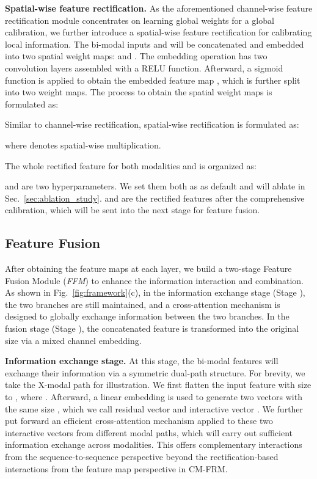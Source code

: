 \documentclass[journal]{IEEEtran}
\begin{document}
\noindent\textbf{Spatial-wise feature rectification.}
As the aforementioned channel-wise feature rectification module concentrates on learning global weights for a global calibration, we further introduce a spatial-wise feature rectification for calibrating local information.
The bi-modal inputs  and  will be concatenated and embedded into two spatial weight maps:  and .
The embedding operation has two  convolution layers assembled with a RELU function. Afterward, a sigmoid function is applied to obtain the embedded feature map , which is further split into two weight maps.
The process to obtain the spatial weight maps is formulated as:


Similar to channel-wise rectification, spatial-wise rectification is formulated as:

where  denotes spatial-wise multiplication.

The whole rectified feature for both modalities  and  is organized as:

 and  are two hyperparameters. We set them both as  as default and will ablate in Sec.~\ref{sec:ablation_study}.  and  are the rectified features after the comprehensive calibration, which will be sent into the next stage for feature fusion.

\subsection{Feature Fusion}
\label{sec:ffm}
After obtaining the feature maps at each layer, we build a two-stage Feature Fusion Module (\emph{FFM}) to enhance the information interaction and combination. As shown in Fig.~\ref{fig:framework}(c), in the information exchange stage (Stage ), the two branches are still maintained, and a cross-attention mechanism is designed to globally exchange information between the two branches.
In the fusion stage (Stage ), the concatenated feature is transformed into the original size via a mixed channel embedding. 

\noindent\textbf{Information exchange stage.}
At this stage, the bi-modal features will exchange their information via a symmetric dual-path structure.
For brevity, we take the X-modal path for illustration. We first flatten the input feature with size  to , where . 
Afterward, a linear embedding is used to generate two vectors with the same size , which we call residual vector  and interactive vector .
We further put forward an efficient cross-attention mechanism applied to these two interactive vectors from different modal paths, which will carry out sufficient information exchange across modalities. This offers complementary interactions from the sequence-to-sequence perspective beyond the rectification-based interactions from the feature map perspective in CM-FRM.
\end{document}
